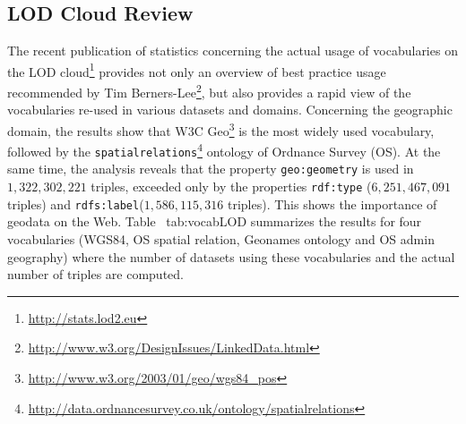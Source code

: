 \documentclass[a4paper,11pt]{report}
\begin{document}
\subsection{LOD Cloud Review}
The recent publication of statistics concerning the actual usage of vocabularies on the LOD cloud\footnote{\url{http://stats.lod2.eu}} provides not only an overview of best practice usage recommended by Tim Berners-Lee\footnote{\url{http://www.w3.org/DesignIssues/LinkedData.html}}, but also provides a rapid view of the vocabularies re-used in various datasets and domains. Concerning the geographic domain, the results show that W3C Geo\footnote{\url{http://www.w3.org/2003/01/geo/wgs84_pos}} is the most widely used vocabulary, followed by the \texttt{spatialrelations}\footnote{\url{http://data.ordnancesurvey.co.uk/ontology/spatialrelations}} ontology of Ordnance Survey (OS). At the same time, the analysis reveals that the property \texttt{geo:geometry} is used in $1,322,302,221$ triples, exceeded only by the properties \texttt{rdf:type} ($6,251,467,091$ triples) and \texttt{rdfs:label}($1,586,115,316$ triples). This shows the importance of geodata on the Web. Table~
{tab:vocabLOD} summarizes the results for four vocabularies (WGS84, OS spatial relation, Geonames ontology and OS admin geography) where the number of datasets using these vocabularies and the actual number of triples are computed.
\begin{table}[!htbp]
\end{table}
\end{document}
